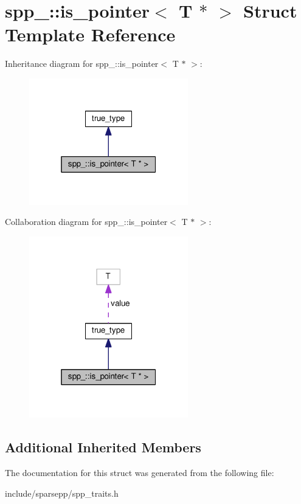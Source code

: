 \hypertarget{structspp___1_1is__pointer_3_01_t_01_5_01_4}{}\section{spp\+\_\+\+:\+:is\+\_\+pointer$<$ T $\ast$ $>$ Struct Template Reference}
\label{structspp___1_1is__pointer_3_01_t_01_5_01_4}


Inheritance diagram for spp\+\_\+\+:\+:is\+\_\+pointer$<$ T $\ast$ $>$\+:\nopagebreak
\begin{figure}[H]
\begin{center}
\leavevmode
\includegraphics[width=196pt]{structspp___1_1is__pointer_3_01_t_01_5_01_4__inherit__graph}
\end{center}
\end{figure}


Collaboration diagram for spp\+\_\+\+:\+:is\+\_\+pointer$<$ T $\ast$ $>$\+:\nopagebreak
\begin{figure}[H]
\begin{center}
\leavevmode
\includegraphics[width=196pt]{structspp___1_1is__pointer_3_01_t_01_5_01_4__coll__graph}
\end{center}
\end{figure}
\subsection*{Additional Inherited Members}


The documentation for this struct was generated from the following file\+:\begin{DoxyCompactItemize}
\item 
include/sparsepp/spp\+\_\+traits.\+h\end{DoxyCompactItemize}
